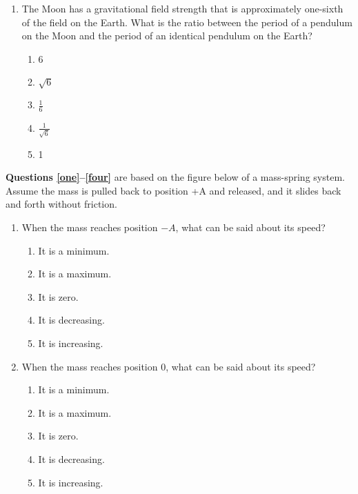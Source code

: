 \documentclass{../../../oss-apphys}
\begin{document}
\begin{multicols}{2}
\begin{enumerate}[leftmargin=18pt]
  \item The Moon has a gravitational field strength that is approximately
    one-sixth of the field on the Earth. What is the ratio between the period
    of a pendulum on the Moon and the period of an identical pendulum on the
    Earth?
    \begin{enumerate}[noitemsep,topsep=0pt,leftmargin=18pt,label=(\Alph*)]
    \item 6
    \item $\sqrt{6}$
    \item $\displaystyle\frac16$
    \item $\displaystyle\frac1{\sqrt{6}}$
    \item 1
    \end{enumerate}
  \end{enumerate}
  \columnbreak

  \textbf{Questions \ref{one}--\ref{four}} are based on the figure below of a
  mass-spring system. Assume the mass is pulled back to position +A and
  released, and it slides back and forth without friction.
  \begin{center}
  \end{center}
  \begin{enumerate}[leftmargin=18pt,resume]
  \item When the mass reaches position $-A$, what can be said about its speed?
    \label{one}
    \begin{enumerate}[noitemsep,topsep=0pt,leftmargin=18pt,label=(\Alph*)]
    \item It is a minimum.
    \item It is a maximum.
    \item It is zero.
    \item It is decreasing.
    \item It is increasing.
    \end{enumerate}
    
  \item When the mass reaches position 0, what can be said about its speed?
    \begin{enumerate}[noitemsep,topsep=0pt,leftmargin=18pt,label=(\Alph*)]
    \item It is a minimum.
    \item It is a maximum.
    \item It is zero.
    \item It is decreasing.
    \item It is increasing.
    \end{enumerate}
    

\end{enumerate}
\end{multicols}
\end{document}
